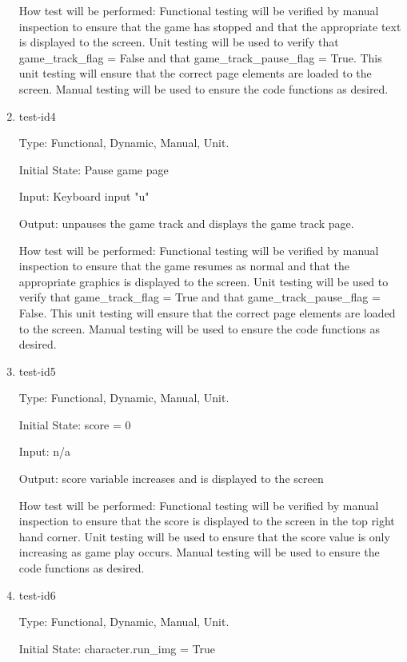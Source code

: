\documentclass[12pt, titlepage]{article}
\begin{document}
\begin{enumerate}
		How test will be performed: Functional testing will be verified by manual inspection to ensure that the game has stopped and that the appropriate text is displayed to the screen. Unit testing will be used to verify that game\_track\_flag = False and that game\_track\_pause\_flag = True. This unit testing will ensure that the correct page elements are loaded to the screen. Manual testing will be used to ensure the code functions as desired. 
		
		\item{test-id4\\}
		
		Type: Functional, Dynamic, Manual, Unit.
		
		Initial State: Pause game page
		
		Input: Keyboard input "u"
		
		Output: unpauses the game track and displays the game track page. 
		
		How test will be performed: Functional testing will be verified by manual inspection to ensure that the game resumes as normal and that the appropriate graphics is displayed to the screen. Unit testing will be used to verify that game\_track\_flag = True and that game\_track\_pause\_flag = False. This unit testing will ensure that the correct page elements are loaded to the screen. Manual testing will be used to ensure the code functions as desired. 
		
		\item{test-id5\\}
		
		Type: Functional, Dynamic, Manual, Unit.
		
		Initial State: score = 0
		
		Input: n/a
		
		Output: score variable increases and is displayed to the screen
		
		How test will be performed: Functional testing will be verified by manual inspection to ensure that the score is displayed to the screen in the top right hand corner. Unit testing will be used to ensure that the score value is only increasing as game play occurs. Manual testing will be used to ensure the code functions as desired.
		
		\item{test-id6\\}
		
		Type: Functional, Dynamic, Manual, Unit.
		
		Initial State: character.run\_img = True
		

\end{enumerate}
\end{document}
